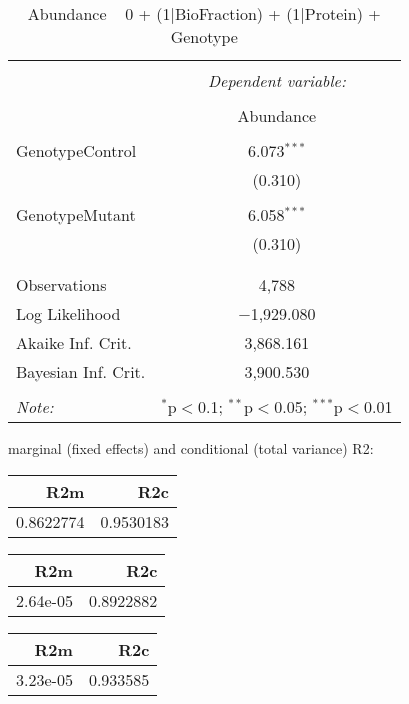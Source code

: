 \documentclass[11pt]{report}
\begin{document}
\begin{table}[!htbp] \centering 
  \caption{Abundance ~ 0 + (1|BioFraction) + (1|Protein) + Genotype} 
  \label{} 
\begin{tabular}{@{\extracolsep{5pt}}lc} 
\\[-1.8ex]\hline 
\hline \\[-1.8ex] 
 & \multicolumn{1}{c}{\textit{Dependent variable:}} \\ 
\cline{2-2} 
\\[-1.8ex] & Abundance \\ 
\hline \\[-1.8ex] 
 GenotypeControl & 6.073$^{***}$ \\ 
  & (0.310) \\ 
  & \\ 
 GenotypeMutant & 6.058$^{***}$ \\ 
  & (0.310) \\ 
  & \\ 
\hline \\[-1.8ex] 
Observations & 4,788 \\ 
Log Likelihood & $-$1,929.080 \\ 
Akaike Inf. Crit. & 3,868.161 \\ 
Bayesian Inf. Crit. & 3,900.530 \\ 
\hline 
\hline \\[-1.8ex] 
\textit{Note:}  & \multicolumn{1}{r}{$^{*}$p$<$0.1; $^{**}$p$<$0.05; $^{***}$p$<$0.01} \\ 
\end{tabular} 
\end{table} 
marginal (fixed effects) and conditional (total variance) R2:

\begin{tabular}{r|r}
\hline
R2m & R2c\\
\hline
0.8622774 & 0.9530183\\
\hline
\end{tabular}

\begin{tabular}{r|r}
\hline
R2m & R2c\\
\hline
2.64e-05 & 0.8922882\\
\hline
\end{tabular}

\begin{tabular}{r|r}
\hline
R2m & R2c\\
\hline
3.23e-05 & 0.933585\\
\hline
\end{tabular}
\end{document}
